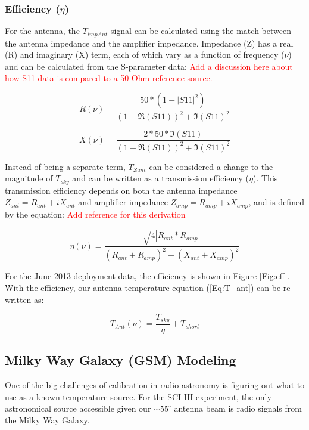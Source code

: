 \subsubsection{Efficiency ($\eta$)}
For the antenna, the $T_{impAnt}$ signal can be calculated using the match between the antenna impedance and the amplifier impedance. Impedance (Z) has a real (R) and imaginary (X) term, each of which vary as a function of frequency ($\nu$) and can be calculated from the S-parameter data: \textcolor{red}{Add a discussion here about how S11 data is compared to a 50 Ohm reference source.}

\begin{equation}
R(\nu) = \frac{50*(1- |S11|^2)}{(1-\Re(S11))^2+\Im(S11)^2}
\end{equation}

\begin{equation}
X(\nu) = \frac{2*50*\Im(S11)}{(1-\Re(S11))^2+\Im(S11)^2}
\end{equation} 

Instead of being a separate term, $T_{Zant}$ can be considered a change to the magnitude of $T_{sky}$ and can be written as a transmission efficiency ($\eta$). This transmission efficiency depends on both the antenna impedance $Z_{ant} = R_{ant}+i X_{ant}$ and amplifier impedance $Z_{amp} = R_{amp} + i X_{amp}$, and is defined by the equation: \textcolor{red}{Add reference for this derivation}

\begin{equation}
\eta (\nu) = \frac{\sqrt{4 |R_{ant}*R_{amp}|}}{(R_{ant}+R_{amp})^2+(X_{ant}+X_{amp})^2}
\end{equation}

For the June 2013 deployment data, the efficiency is shown in Figure \ref{Fig:eff}. With the efficiency, our antenna temperature equation (\ref{Eq:T_ant}) can be re-written as:

\begin{equation}
T_{Ant}(\nu) = \frac{T_{sky}}{\eta} + T_{short}
\end{equation}


\subsection{Milky Way Galaxy (GSM) Modeling} \label{Sec:model}

One of the big challenges of calibration in radio astronomy is figuring out what to use as a known temperature source. For the SCI-HI experiment, the only astronomical source accessible given our $\sim 55 ^\circ$ antenna beam is radio signals from the Milky Way Galaxy. 

